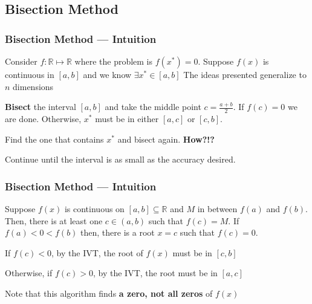 \documentclass[11pt,xcolor={svgnames},aspectratio=169,usepdftitle=false]{beamer}
\let\toneitemize\itemize
\let\ttwoitemize\enditemize
\renewenvironment{itemize}{\toneitemize\addtolength{\itemsep}{0.7\baselineskip}}{\ttwoitemize}
\begin{document}
\subsection{Bisection Method}

\begin{frame}
  \frametitle{Bisection Method --- Intuition}
Consider $f : \mathbb{R} \mapsto \mathbb{R}$ where the problem is $f(x^*) = 0$. Suppose $f(x)$ is continuous in $[a,b]$ and we know $\exists x^*\in[a,b]$ {\tiny The ideas presented generalize to $n$ dimensions}

\begin{itemize}
  \item \textbf{Bisect} the interval $[a,b]$ and take the middle point $c = \frac{a + b}{2}$. If $f(c) = 0$ we are done. Otherwise, $x^*$ must be in either $[a,c]$ or $[c,b]$.
  \item Find the one that contains $x^*$ and bisect again. \alert{\textbf{How?!?}}
  \item Continue until the interval is as small as the accuracy desired.
\end{itemize}
\end{frame}

\begin{frame}
  \frametitle{Bisection Method --- Intuition}
\begin{theorem}
Suppose $f(x)$ is continuous on $[a,b]\subseteq\mathbb{R}$ and $M$ in between $f(a)$ and $f(b)$. Then, there is at least one $c\in(a,b)$ such that $f(c) = M$. If $f(a) < 0 < f(b)$ then, there is a root $x = c$ such that $f(c) = 0$.
\end{theorem}

\begin{itemize}
  \item If $f(c) < 0$, by the IVT, the root of $f(x)$ must be in $[c,b]$
  \item Otherwise, if $f(c) > 0$, by the IVT, the root must be in $[a,c]$
  \item Note that this algorithm finds \alert{\textbf{a zero, not all zeros}} of $f(x)$
\end{itemize}
\end{frame}
\end{document}
